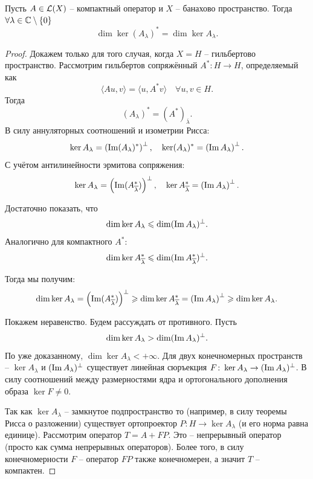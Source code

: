 \begin{theorem}\label{th:dim-ker-equality}
    Пусть $A \in \mathcal{L}(X)$ -- компактный оператор и $X$ -- банахово пространство.
    Тогда $\forall \lambda \in \mathbb{C} \setminus \{0\}$
    \[
        \dim \ker (A_\lambda)^* = \dim \ker A_\lambda.
    \]
\end{theorem}
\begin{proof}
    Докажем только для того случая, когда $X = H$ -- гильбертово пространство.
    Рассмотрим гильбертов сопряжённый $A^*\colon H \to H$, определяемый как
    \[
        \langle A u, v \rangle = \langle u, A^* v \rangle \quad \forall u, v \in H.
    \]
    Тогда
    \[
        (A_\lambda)^* = (A^*)_{\overline{\lambda}}.
    \]
    В силу аннуляторных соотношений и изометрии Рисса:
    \[
        \ker A_\lambda = \left(\operatorname{Im} (A_\lambda)^*\right)^\perp, \quad \ker (A_\lambda)^* = \left(\operatorname{Im} A_\lambda \right)^\perp.
    \]
    С учётом антилинейности эрмитова сопряжения:
    \[
        \ker A_\lambda = \left(\operatorname{Im} (A^*_{\overline{\lambda}})\right)^\perp, \quad \ker A_{\overline{\lambda}}^* = \left(\operatorname{Im} A_\lambda \right)^\perp.
    \]

    Достаточно показать, что 
    \[
        \dim \ker A_\lambda \leqslant \dim (\operatorname{Im} A_\lambda)^\perp.
    \]
    Аналогично для компактного $A^*$:
    \[
        \dim \ker A^*_{\overline{\lambda}} \leqslant \dim (\operatorname{Im} A^*_{\overline{\lambda}})^\perp.
    \]

    Тогда мы получим:
    \[
        \dim \ker A_\lambda = \left(\operatorname{Im} (A^*_{\overline{\lambda}})\right)^\perp \geqslant \dim \ker A^*_{\overline{\lambda}} = \left(\operatorname{Im} A_\lambda \right)^\perp \geqslant \dim \ker A_\lambda.
    \]

    Покажем неравенство. 
    Будем рассуждать от противного.
    Пусть 
    \[
        \dim \ker A_\lambda > \dim (\operatorname{Im} A_\lambda)^\perp.
    \]
    По уже доказанному, $\dim \ker A_\lambda < +\infty$.
    Для двух конечномерных пространств -- $\ker A_\lambda$ и $(\operatorname{Im} A_\lambda)^\perp$ существует линейная сюръекция $F\colon \ker A_\lambda \to (\operatorname{Im} A_\lambda)^\perp$.
    В силу соотношений между размерностями ядра и ортогонального дополнения образа $\ker F \neq 0$.
    
    Так как $\ker A_\lambda$ -- замкнутое подпространство то (например, в силу теоремы Рисса о разложении) существует ортопроектор $P\colon H \to \ker A_\lambda$ (и его норма равна единице).
    Рассмотрим оператор $T = A + FP$.
    Это -- непрерывный оператор (просто как сумма непрерывных операторов).
    Более того, в силу конечномерности $F$ -- оператор $FP$ также конечномерен, а значит $T$ -- компактен.


\end{proof}
